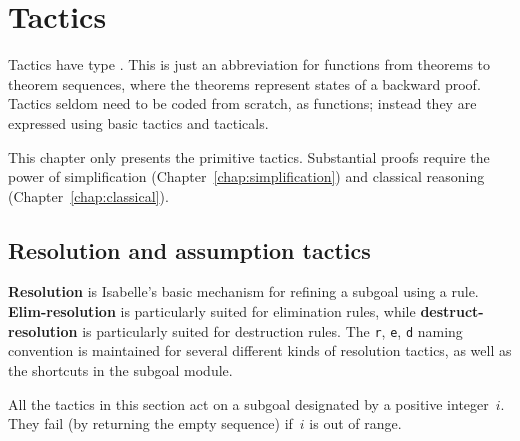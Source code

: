 \chapter{Tactics} \label{tactics}
 Tactics have type .  This is just an
abbreviation for functions from theorems to theorem sequences, where
the theorems represent states of a backward proof.  Tactics seldom
need to be coded from scratch, as functions; instead they are
expressed using basic tactics and tacticals.

This chapter only presents the primitive tactics.  Substantial proofs require
the power of simplification (Chapter~\ref{chap:simplification}) and classical
reasoning (Chapter~\ref{chap:classical}).

\section{Resolution and assumption tactics}
{\bf Resolution} is Isabelle's basic mechanism for refining a subgoal using
a rule.  {\bf Elim-resolution} is particularly suited for elimination
rules, while {\bf destruct-resolution} is particularly suited for
destruction rules.  The {\tt r}, {\tt e}, {\tt d} naming convention is
maintained for several different kinds of resolution tactics, as well as
the shortcuts in the subgoal module.

All the tactics in this section act on a subgoal designated by a positive
integer~$i$.  They fail (by returning the empty sequence) if~$i$ is out of
range.


